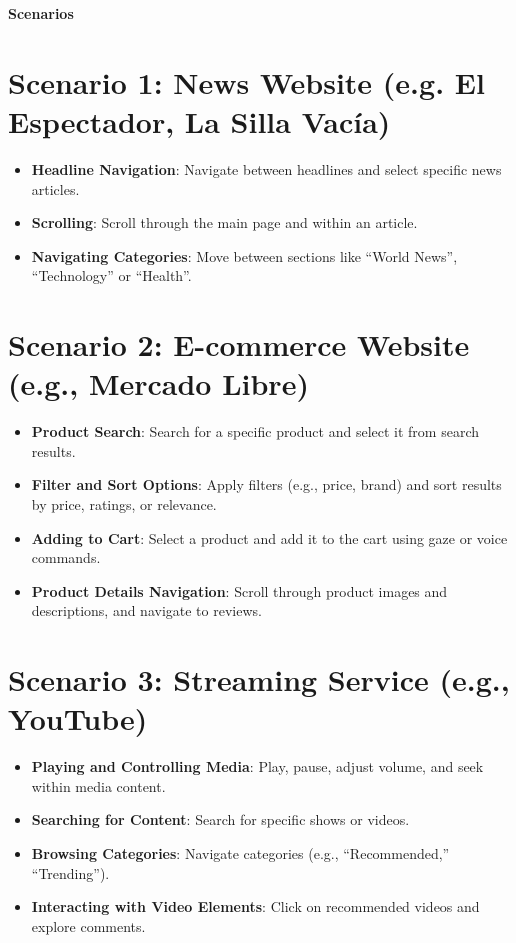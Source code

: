 \documentclass[letterpaper, 12pt]{article}
\date{}
\begin{document}
\begin{center}
    {\Large \textbf{Scenarios}\par}
\end{center}
\medskip

\section*{Scenario 1: News Website (e.g. El Espectador, La Silla Vacía)}
\begin{itemize}
    \item \textbf{Headline Navigation}: Navigate between headlines and select specific news articles.
    \item \textbf{Scrolling}: Scroll through the main page and within an article.
    \item \textbf{Navigating Categories}: Move between sections like “World News”, “Technology” or “Health”.
\end{itemize}

\section*{Scenario 2: E-commerce Website (e.g., Mercado Libre)}
\begin{itemize}
    \item \textbf{Product Search}: Search for a specific product and select it from search results.
    \item \textbf{Filter and Sort Options}: Apply filters (e.g., price, brand) and sort results by price, ratings, or relevance.
    \item \textbf{Adding to Cart}: Select a product and add it to the cart using gaze or voice commands.
    \item \textbf{Product Details Navigation}: Scroll through product images and descriptions, and navigate to reviews.
\end{itemize}

\section*{Scenario 3: Streaming Service (e.g., YouTube)}
\begin{itemize}
    \item \textbf{Playing and Controlling Media}: Play, pause, adjust volume, and seek within media content.
    \item \textbf{Searching for Content}: Search for specific shows or videos.
    \item \textbf{Browsing Categories}: Navigate categories (e.g., “Recommended,” “Trending”).
    \item \textbf{Interacting with Video Elements}: Click on recommended videos and explore comments.
\end{itemize}
\end{document}

